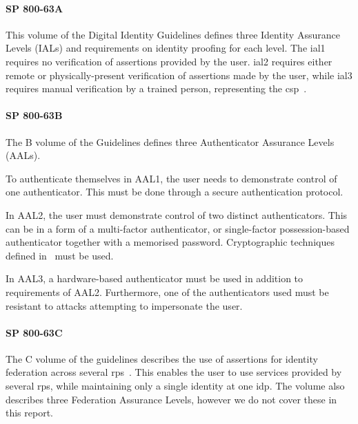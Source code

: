 \paragraph{SP 800-63A}
This volume of the Digital Identity Guidelines defines three Identity Assurance Levels (IALs) and requirements on identity proofing for each level. The \acrshort{ial}1 requires no verification of assertions provided by the user. \acrshort{ial}2 requires either remote or physically-present verification of assertions made by the user, while \acrshort{ial}3 requires manual verification by a trained person, representing the \acrshort{csp}~\cite{Grassi2017DigitalProofing}.

\paragraph{SP 800-63B}
The B volume of the Guidelines defines three Authenticator Assurance Levels (AALs).

To authenticate themselves in AAL1, the user needs to demonstrate control of one authenticator. This must be done through a secure authentication protocol.

In AAL2, the user must demonstrate control of two distinct authenticators. This can be in a form of a multi-factor authenticator, or single-factor possession-based authenticator together with a memorised password. Cryptographic techniques defined in~\cite{Evans2001SECURITYMODULES} must be used.

In AAL3, a hardware-based authenticator must be used in addition to requirements of AAL2. Furthermore, one of the authenticators used must be resistant to attacks attempting to impersonate the user.

\paragraph{SP 800-63C}
The C volume of the guidelines describes the use of assertions for identity federation across several \acrshort{rp}s~\cite{Grassi2017DigitalAssertions}. This enables the user to use services provided by several \acrshort{rp}s, while maintaining only a single identity at one \acrshort{idp}. The volume also describes three Federation Assurance Levels, however we do not cover these in this report.


